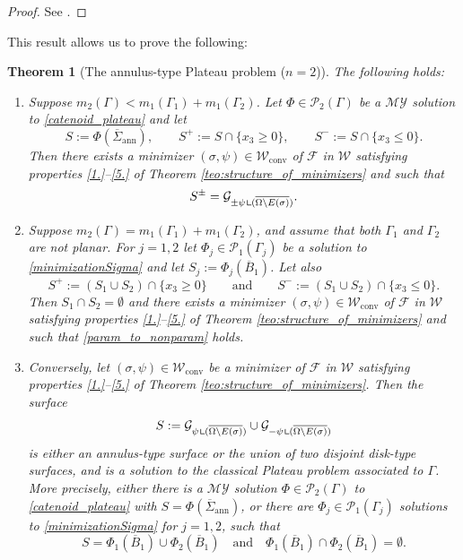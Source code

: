 \documentclass[JEP,XML,SOM,Unicode, NoFloatCountersInSection,published]{cedram}
\let\Om\Omega
\newcommand\admclassconv{{\mathcal W_\mathrm{conv}}}
\newcommand{\immclosedann}{\Phi({\overline\Sigma}_\mathrm{ann})}
\newcommand{\resa}{\mathop{\hbox{\vrule height 7pt width 0.5pt depth 0pt
\vrule height 0.5pt width 6pt depth 0pt}}\nolimits}
\newcommand{\resb}{\mathop{\hbox{\vrule height 4pt width 0.5pt depth 0pt
\vrule height 0.5pt width 3pt depth 0pt}}\nolimits}
\newcommand{\res}{\mathchoice{\resa}{\resa}{\resb}{\resb}}
\newtheorem{theorem}{Theorem}[section]
\theoremstyle{definition}
\begin{document}
\begin{proof}
See \cite{MY}.
\end{proof}
This result allows us to prove the following:
\begin{theorem}[The annulus-type Plateau problem ($n=2$)]
\label{teo:the_annulus_type_Plateau_problem_n=2}
The following holds:
\begin{enumerate}[{\rm(i)},wide]
\item \label{1plateau} Suppose $m_2(\Gamma)<m_1(\Gamma_1)+m_1(\Gamma_2)$.
Let $\Phi\in\mathcal{P}_2(\Gamma)$
be a $\mathcal{MY}$ solution to \eqref{catenoid_plateau} and let
\begin{equation*}
S:=\immclosedann, \qquad
S^+:=S\cap\{x_3\ge0\},\qquad
S^-:=S\cap\{x_3\le0\}.
\end{equation*}
Then there exists a minimizer $(\sigma,\psi)\in \admclassconv$
of $\mathcal F$ in $\mathcal W$ satisfying properties \ref{1.}--\ref{5.} of Theorem \ref{teo:structure_of_minimizers} and such that
\begin{equation}\label{param_to_nonparam}
S^{\pm}=\mathcal G_{\pm\psi\res (\overline{\Om\setminus E(\sigma)})}.
\end{equation}
\item\label{2plateau} Suppose $m_2(\Gamma)= m_1(\Gamma_1)+m_1(\Gamma_2)$, { and assume that both $\Gamma_1$ and $\Gamma_2$ are not planar}. For $j=1,2$ let $\Phi_j\in\mathcal{P}_1(\Gamma_j)$ be a solution to \eqref{minimizationSigma} and let $S_j:=\Phi_j(\overline B_1)$. Let also
\begin{equation*}
S^+:=(S_1\cup S_2)\cap\{x_3\ge0\}\qquad\text{and}\qquad
S^-:=(S_1\cup S_2)\cap\{x_3\le0\}.
\end{equation*}
Then $S_1\cap S_2=\emptyset$ and there exists a minimizer $(\sigma,\psi)\in \admclassconv$ of $\mathcal F$ in $\mathcal W$ satisfying properties \ref{1.}--\ref{5.} of Theorem \ref{teo:structure_of_minimizers} and such that \eqref{param_to_nonparam} holds.
\item \label{3plateau}
Conversely, let $(\sigma,\psi)\in \admclassconv$ be a minimizer of $\mathcal F$ in $\mathcal W$ satisfying properties \ref{1.}--\ref{5.} of Theorem \ref{teo:structure_of_minimizers}. Then the surface
\[
S:=\mathcal G_{\psi\res (\overline{\Om\setminus E(\sigma)})}\cup\mathcal G_{-\psi\res (\overline{\Om\setminus E(\sigma)})}
\]
is either an annulus-type surface or the union of two disjoint disk-type surfaces, and is a solution to the classical Plateau problem associated to $\Gamma$. More precisely, either there is a $\mathcal{MY}$ solution $\Phi\in\mathcal{P}_2(\Gamma)$ to \eqref{catenoid_plateau} with
$S=\immclosedann$, or there are $\Phi_j\in\mathcal{P}_1(\Gamma_j)$ solutions to \eqref{minimizationSigma} for $j=1,2$, such that
\[
S=\Phi_1(\overline B_1)\cup \Phi_2(\overline B_1)\quad\text{and}\quad\Phi_1(\overline B_1)\cap \Phi_2(\overline B_1)=\emptyset.
\]
\end{enumerate}
\end{theorem}
\end{document}
